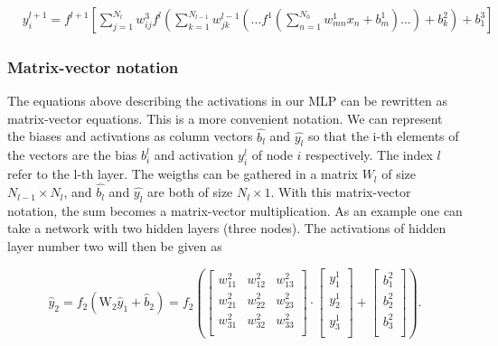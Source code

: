 \documentclass[a4paper,12pt]{article}
\begin{document}
\begin{align}
&y^{l+1}_i = f^{l+1}\left[\!\sum_{j=1}^{N_l} w_{ij}^3 f^l\left(\sum_{k=1}^{N_{l-1}}w_{jk}^{l-1}\left(\dots f^1\left(\sum_{n=1}^{N_0} w_{mn}^1 x_n+ b_m^1\right)\dots\right)+b_k^2\right)+b_1^3\right]
\end{align}


\subsubsection{Matrix-vector notation}
The equations above describing the activations in our MLP can be rewritten as matrix-vector equations. This is a more convenient notation.\newline
We can represent the biases and activations as column vectors $\hat{b_l}$ and $\hat{y_l}$ so that the i-th elements of the vectors are the bias $b_i^l$ and activation $y_i^l$ of node $i$ respectively. The index $l$ refer to the l-th layer.\newline
The weigths can be gathered in a matrix $W_l$ of size $N_{l-1} \times N_l$, and $\hat{b_l}$ and $\hat{y_l}$ are both of size $N_l \times 1$. With this matrix-vector notation, the sum becomes a matrix-vector multiplication. As an example one can take a network with two hidden layers (three nodes). The activations of hidden layer number two will then be given as

\begin{equation}
 \hat{y}_2 = f_2(\mathrm{W}_2 \hat{y}_{1} + \hat{b}_{2}) = 
 f_2\left(\left[\begin{array}{ccc}
    w^2_{11} &w^2_{12} &w^2_{13} \\
    w^2_{21} &w^2_{22} &w^2_{23} \\
    w^2_{31} &w^2_{32} &w^2_{33} \\
    \end{array} \right] \cdot
    \left[\begin{array}{c}
           y^1_1 \\
           y^1_2 \\
           y^1_3 \\
          \end{array}\right] + 
    \left[\begin{array}{c}
           b^2_1 \\
           b^2_2 \\
           b^2_3 \\
          \end{array}\right]\right).
\end{equation}
\end{document}

